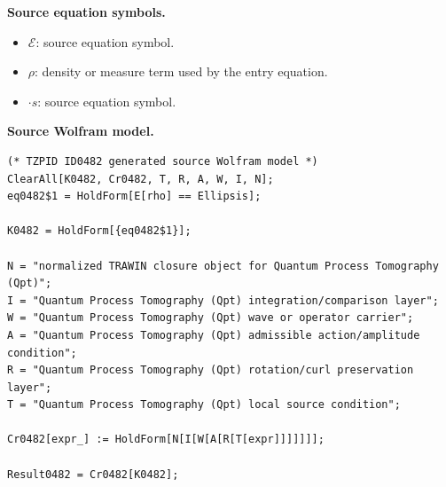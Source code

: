 \begin{minipage}[t]{0.49\linewidth}
\begingroup
\small
\raggedright
\textbf{Source equation symbols.}\par
\begin{itemize}[leftmargin=1.35em,itemsep=1pt,topsep=1pt,parsep=0pt]
    \item $\mathcal{E}$: source equation symbol.
    \item $\rho$: density or measure term used by the entry equation.
    \item $\cdot s$: source equation symbol.
\end{itemize}
\endgroup
\end{minipage}\hfill
\begin{minipage}[t]{0.47\linewidth}
\begingroup
\scriptsize
\raggedright
\textbf{Source Wolfram model.}\par
\begin{Verbatim}[fontsize=\tiny,breaklines=true,breakanywhere=true]
(* TZPID ID0482 generated source Wolfram model *)
ClearAll[K0482, Cr0482, T, R, A, W, I, N];
eq0482$1 = HoldForm[E[rho] == Ellipsis];

K0482 = HoldForm[{eq0482$1}];

N = "normalized TRAWIN closure object for Quantum Process Tomography (Qpt)";
I = "Quantum Process Tomography (Qpt) integration/comparison layer";
W = "Quantum Process Tomography (Qpt) wave or operator carrier";
A = "Quantum Process Tomography (Qpt) admissible action/amplitude condition";
R = "Quantum Process Tomography (Qpt) rotation/curl preservation layer";
T = "Quantum Process Tomography (Qpt) local source condition";

Cr0482[expr_] := HoldForm[N[I[W[A[R[T[expr]]]]]]];

Result0482 = Cr0482[K0482];
\end{Verbatim}
\endgroup
\end{minipage}

